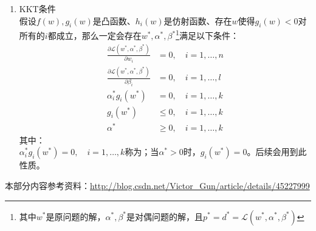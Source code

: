 \begin{enumerate}
	\item KKT条件 \\
	假设$f(w), g_i(w)$是凸函数、$h_i(w)$是仿射函数、存在$w$使得$g_i(w) < 0$对所有的$i$都成立，那么一定会存在$w^*, \alpha^*, \beta^*$\footnote{其中$w^*$是原问题的解，$\alpha^*, \beta^*$是对偶问题的解，且$p^*=d^*=\mathcal{L}(w^*, \alpha^*, \beta^*)$}满足以下条件：
	\begin{align}
		\frac{\partial\mathcal{L}(w^*, \alpha^*, \beta^*)}{\partial w_i} &= 0, \quad i=1, \dots, n \\
		\frac{\partial\mathcal{L}(w^*, \alpha^*, \beta^*)}{\partial \beta_i} &= 0, \quad i=1, \dots, l \\
		\alpha_i^*g_i(w^*) &= 0, \quad i=1, \dots, k \\
		g_i(w^*) &\leq 0, \quad i=1, \dots, k  \\
		\alpha^* &\geq 0, \quad i=1, \dots, k 
	\end{align}
	其中：\\
	$\alpha_i^*g_i(w^*) = 0, \quad i=1, \dots, k$称为{\color{blue}{KKT对偶互补条件}}；当$\alpha^* > 0$时，$g_i(w^*) = 0$。后续会用到此性质。
\end{enumerate}
本部分内容参考资料：\url{http://blog.csdn.net/Victor_Gun/article/details/45227999}








































